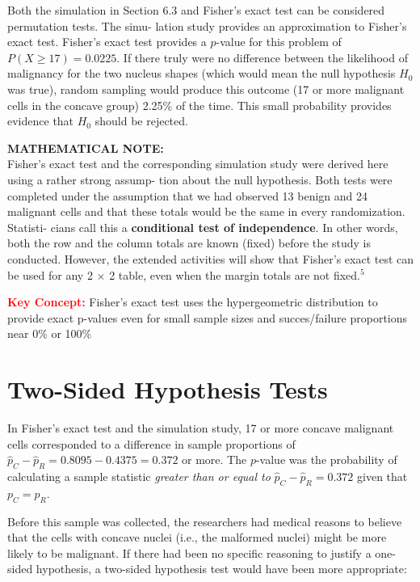 \documentclass[
]{report}
\begin{document}
Both the simulation in Section 6.3 and Fisher's exact test can be considered permutation tests. The simu-
lation study provides an approximation to Fisher's exact test. Fisher's exact test provides a \(p\)-value for this
problem of \(P(X \geq 17)= 0.0225\). If there truly were no difference between the likelihood of malignancy for
the two nucleus shapes (which would mean the null hypothesis \(H_0\) was true), random sampling would produce
this outcome (17 or more malignant cells in the concave group) 2.25\% of the time. This small probability
provides evidence that \(H_0\) should be rejected.

\large

\textbf{MATHEMATICAL NOTE:}\\
Fisher's exact test and the corresponding simulation study were derived here using a rather strong assump-
tion about the null hypothesis. Both tests were completed under the assumption that we had observed 13
benign and 24 malignant cells and that these totals would be the same in every randomization. Statisti-
cians call this a \textbf{conditional test of independence}. In other words, both the row and the column totals
are known (fixed) before the study is conducted. However, the extended activities will show that Fisher's
exact test can be used for any 2 \(\times\) 2 table, even when the margin totals are not fixed.\(^5\)
\normalsize 

\Large

\textbf{\textcolor{red}{Key Concept:}}
\color{red}Fisher's exact test uses the hypergeometric distribution to provide exact p-values even for small sample sizes and succes/failure proportions near 0\% or 100\%
\color{black}
\normalsize

\section{\texorpdfstring{\textbf{Two-Sided Hypothesis Tests}}{Two-Sided Hypothesis Tests}}\label{two-sided-hypothesis-tests}

In Fisher's exact test and the simulation study, 17 or more concave malignant cells corresponded to a difference in sample proportions of \(\hat p_C - \hat p_R = 0.8095 - 0.4375 = 0.372\) or more. The \(p\)-value was the probability of calculating a sample statistic \emph{greater than or equal to} \(\hat p_C - \hat p_R = 0.372\) given that \(p_C = p_R\).

Before this sample was collected, the researchers had medical reasons to believe that the cells with concave nuclei (i.e., the malformed nuclei) might be more likely to be malignant. If there had been no specific reasoning to justify a one-sided hypothesis, a two-sided hypothesis test would have been more appropriate:
\end{document}
